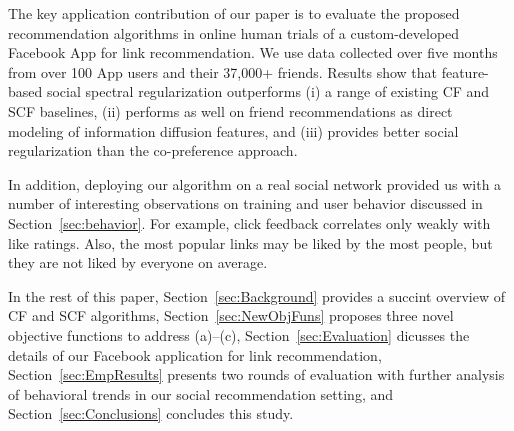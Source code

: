 The key application contribution of our paper is to evaluate the
proposed recommendation algorithms in online human trials of a
custom-developed Facebook App for link recommendation.  We use data
collected over five months from over 100 App users and their 37,000+
friends.  Results show that feature-based social spectral 
regularization outperforms (i) a range of
existing CF and SCF baselines, (ii) performs as well on friend
recommendations as direct modeling of information diffusion features,
and (iii) provides better social regularization than the co-preference
approach.

In addition, deploying our algorithm on a real social network provided
us with a number of interesting observations on training and user
behavior discussed in Section~\ref{sec:behavior}.  For example, click
feedback correlates only weakly with like ratings.
Also, the most popular links may be liked by the most people, but they
are not liked by everyone on average.

In the rest of this paper, Section~\ref{sec:Background} provides a
succint overview of CF and SCF algorithms,
Section~\ref{sec:NewObjFuns} proposes three novel objective functions
to address (a)--(c), Section~\ref{sec:Evaluation} dicusses the details
of our Facebook application for link recommendation,
Section~\ref{sec:EmpResults} presents two rounds of evaluation 
with further analysis of behavioral trends in our
social recommendation setting, and Section~\ref{sec:Conclusions}
concludes this study.

